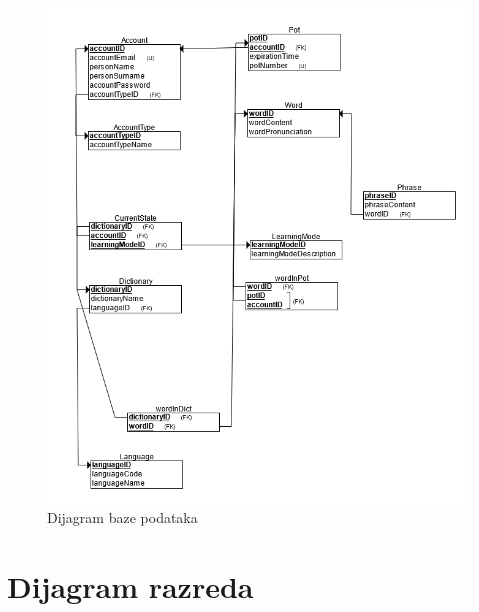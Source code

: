 				\begin{figure}[H]
					\includegraphics[width=\textwidth]{slike/dijagramBP.PNG}
					\caption{Dijagram baze podataka}
					\label{fig:dijagramBP}
				\end{figure}
				
				\newpage
			
			
		\section{Dijagram razreda}
		
			
			
			
